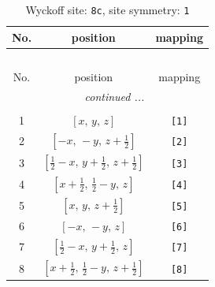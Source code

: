 \documentclass[fleqn,8pt]{jsarticle}
\begin{document}
\renewcommand{\arraystretch}{1.2}
\begin{longtable}{ccc}
\caption{Wyckoff site: {\tt 8c}, site symmetry: {\tt 1}}
 \\
 \hline \hline
No. & position & mapping \\ \hline \endfirsthead

\multicolumn{2}{l}{\tablename\ \thetable{}} \\
 \hline \hline
No. & position & mapping \\ \hline \endhead

 \hline \hline
\multicolumn{2}{r}{\footnotesize\it continued ...} \\ \endfoot

 \hline \hline
\multicolumn{2}{r}{} \\ \endlastfoot

1 & $\left[ x,\, y,\, z \right]$ & {\tt [1]} \\ \hline
2 & $\left[ - x,\, - y,\, z + \frac{1}{2} \right]$ & {\tt [2]} \\ \hline
3 & $\left[ \frac{1}{2} - x,\, y + \frac{1}{2},\, z + \frac{1}{2} \right]$ & {\tt [3]} \\ \hline
4 & $\left[ x + \frac{1}{2},\, \frac{1}{2} - y,\, z \right]$ & {\tt [4]} \\ \hline
5 & $\left[ x,\, y,\, z + \frac{1}{2} \right]$ & {\tt [5]} \\ \hline
6 & $\left[ - x,\, - y,\, z \right]$ & {\tt [6]} \\ \hline
7 & $\left[ \frac{1}{2} - x,\, y + \frac{1}{2},\, z \right]$ & {\tt [7]} \\ \hline
8 & $\left[ x + \frac{1}{2},\, \frac{1}{2} - y,\, z + \frac{1}{2} \right]$ & {\tt [8]} \\
\end{longtable}
\end{document}
